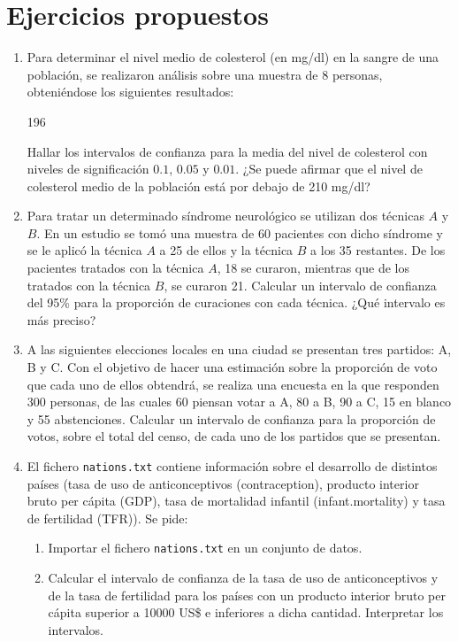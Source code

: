 \section{Ejercicios propuestos}
\begin{enumerate}[leftmargin=*] \item  Para determinar el nivel medio de colesterol (en mg/dl) en la sangre de una población, se
realizaron análisis sobre una muestra de 8 personas, obteniéndose los siguientes resultados: 
\begin{center}
196
\end{center}
Hallar los intervalos de confianza para la media del nivel de colesterol con niveles de significación $0.1$, $0.05$ y
$0.01$. ¿Se puede afirmar que el nivel de colesterol medio de la población está por debajo de 210 mg/dl?

\item Para tratar un determinado síndrome neurológico se utilizan dos técnicas $A$ y $B$. En un estudio se tomó una
muestra de 60 pacientes con dicho síndrome y se le aplicó la técnica $A$ a 25 de ellos y la técnica $B$ a los 35
restantes. De los pacientes tratados con la técnica $A$, 18 se curaron, mientras que de los tratados con la técnica $B$,
se curaron 21. Calcular un intervalo de confianza del 95\% para la proporción de curaciones con cada técnica. ¿Qué intervalo es más preciso?

\item A las siguientes elecciones locales en una ciudad se presentan tres partidos: A, B y C. Con el objetivo de hacer
una estimación sobre la proporción de voto que cada uno de ellos obtendrá, se realiza una encuesta en la que responden
300 personas, de las cuales 60 piensan votar a A, 80 a B, 90 a C, 15 en blanco y 55 abstenciones. Calcular un intervalo
de confianza para la proporción de votos, sobre el total del censo, de cada uno de los partidos que se presentan.

\item El fichero \texttt{nations.txt} contiene información sobre el desarrollo de distintos países (tasa de uso de
anticonceptivos (contraception), producto interior bruto per cápita (GDP), tasa de mortalidad infantil
(infant.mortality) y tasa de fertilidad (TFR)). Se pide:
\begin{enumerate}
\item Importar el fichero \texttt{nations.txt} en un conjunto de datos.
\item Calcular el intervalo de confianza de la tasa de uso de anticonceptivos y de la tasa de fertilidad para los países con un producto
interior bruto per cápita superior a 10000 US\$ e inferiores a dicha cantidad. Interpretar los intervalos. 
\end{enumerate}
\end{enumerate}
